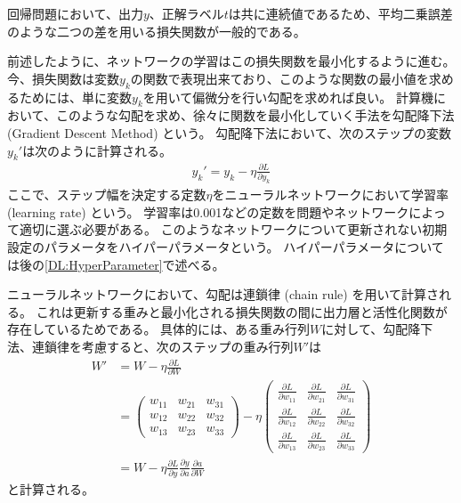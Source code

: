 回帰問題において、出力$y$、正解ラベル$t$は共に連続値であるため、平均二乗誤差のような二つの差を用いる損失関数が一般的である。

前述したように、ネットワークの学習はこの損失関数を最小化するように進む。
今、損失関数は変数$y_k$の関数で表現出来ており、このような関数の最小値を求めるためには、単に変数$y_k$を用いて偏微分を行い勾配を求めれば良い。
計算機において、このような勾配を求め、徐々に関数を最小化していく手法を勾配降下法 (Gradient Descent Method) という。
勾配降下法において、次のステップの変数$y_k'$は次のように計算される。
\begin{equation}
 \begin{split}
  y_k' = y_k - \eta \frac{\partial L}{\partial y_k}
 \end{split}
\end{equation}
ここで、ステップ幅を決定する定数$\eta$をニューラルネットワークにおいて学習率 (learning rate) という。
学習率は0.001などの定数を問題やネットワークによって適切に選ぶ必要がある。
このようなネットワークについて更新されない初期設定のパラメータをハイパーパラメータという。
ハイパーパラメータについては後の\ref{DL:HyperParameter}で述べる。

ニューラルネットワークにおいて、勾配は連鎖律 (chain rule) を用いて計算される。
これは更新する重みと最小化される損失関数の間に出力層と活性化関数が存在しているためである。
具体的には、ある重み行列$W$に対して、勾配降下法、連鎖律を考慮すると、次のステップの重み行列$W'$は
\begin{equation}
 \begin{split}
  W' &= W - \eta \frac{\partial L}{\partial W}\\
    &=
  \left(
    \begin{array}{ccc}
      w_{11} & w_{21} & w_{31} \\
      w_{12} & w_{22} & w_{32} \\
      w_{13} & w_{23} & w_{33}
    \end{array}
  \right)
  - \eta
  \left(
    \begin{array}{ccc}
      \frac{\partial L}{\partial w_{11}} & \frac{\partial L}{\partial w_{21}} & \frac{\partial L}{\partial w_{31}} \\
      \frac{\partial L}{\partial w_{12}} & \frac{\partial L}{\partial w_{22}} & \frac{\partial L}{\partial w_{32}} \\
      \frac{\partial L}{\partial w_{13}} & \frac{\partial L}{\partial w_{23}} & \frac{\partial L}{\partial w_{33}}
    \end{array}
  \right)\\
    &= W - \eta \frac{\partial L}{\partial y}\frac{\partial y}{\partial a}\frac{\partial a}{\partial W}
 \end{split}
\end{equation}
と計算される。

